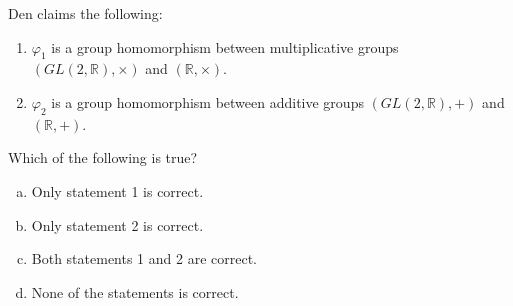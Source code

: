 \documentclass[../lecture-notes.tex]{subfiles}
\begin{document}
Den claims the following:
\begin{enumerate}
    \item $\varphi_1$ is a group homomorphism between multiplicative groups $(GL(2,\mathbb{R}), \times)$ and $(\mathbb{R}, \times)$.
    \item $\varphi_2$ is a group homomorphism between additive groups $(GL(2, \mathbb{R}), +)$ and $(\mathbb{R}, +)$.
\end{enumerate}

Which of the following is true?

\begin{enumerate}[a)]
    \item Only statement 1 is correct.
    \item Only statement 2 is correct.
    \item Both statements 1 and 2 are correct.
    \item None of the statements is correct.
\end{enumerate}
\end{document}
